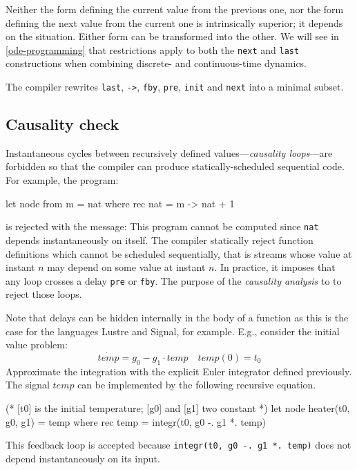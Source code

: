\documentclass[11pt,titlepage,twoside]{report}
\newcommand{\lustre}{{\sf Lustre}}
\newcommand{\signal}{{\sf Signal}}
\newcommand{\Remark}{\medskip\noindent{\bf Remark: }}
\begin{document}
Neither the form defining the current value from the previous one, nor the 
form defining the next value from the current one is intrinsically superior; 
it depends on the situation.
Either form can be transformed into the other.
We will see in \cref{ode-programming} that restrictions apply to both the 
\verb-next- and \verb-last- constructions when combining discrete- and
continuous-time dynamics.

\Remark The compiler rewrites \verb-last-, \verb+->+, \verb-fby-, 
\verb+pre+, \verb+init+ and \verb+next+ into a minimal subset.

\subsection{Causality check\label{causalcheck}} %

Instantaneous cycles between recursively defined values---\emph{causality 
loops}---are forbidden so that the compiler can produce statically-scheduled 
sequential code.
For example, the program:%
\begin{chklisting}[fail]
let node from m = nat where
  rec nat = m -> nat + 1
\end{chklisting}
is rejected with the message:
\chklistingerr{}
\noindent
This program cannot be computed since \verb+nat+ depends instantaneously on 
itself.
The compiler statically reject function definitions which cannot be 
scheduled sequentially, that is streams whose value at instant $n$ may 
depend on some value at instant $n$.
In practice, it imposes that any loop
crosses a delay \verb-pre- or \verb-fby-. The purpose of
the \emph{causality analysis} to to reject those loops.

\newcommand{\temp}{\mathit{temp}}

Note that delays can be hidden internally in the body of a function as
this is the case for the languages \lustre{} and \signal, for
example. E.g., consider the initial value problem:
\[
\dot{\temp} = g_0 - g_1 \cdot \temp \quad \temp(0) = t_0
\]
Approximate the integration with the explicit Euler integrator defined previously. The
signal $\temp$ can be implemented by the following recursive equation.
\begin{chklisting}[withresult,include=integr]
(* [t0] is the initial temperature; [g0] and [g1] two constant *)
let node heater(t0, g0, g1) = temp where
  rec temp = integr(t0, g0 -. g1 *. temp)
\end{chklisting}
This feedback loop is accepted because \verb+integr(t0, g0 -. g1 *. temp)+ does
not depend instantaneously on its input.
\end{document}
